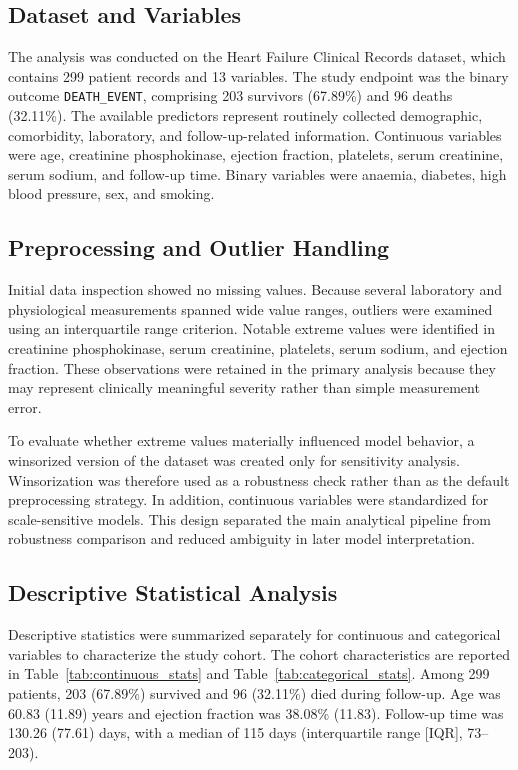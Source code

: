 \subsection{Dataset and Variables}
The analysis was conducted on the Heart Failure Clinical Records dataset, which contains 299 patient records and 13 variables. The study endpoint was the binary outcome \texttt{DEATH\_EVENT}, comprising 203 survivors (67.89\%) and 96 deaths (32.11\%). The available predictors represent routinely collected demographic, comorbidity, laboratory, and follow-up-related information. Continuous variables were age, creatinine phosphokinase, ejection fraction, platelets, serum creatinine, serum sodium, and follow-up time. Binary variables were anaemia, diabetes, high blood pressure, sex, and smoking.


\subsection{Preprocessing and Outlier Handling}
Initial data inspection showed no missing values. Because several laboratory and physiological measurements spanned wide value ranges, outliers were examined using an interquartile range criterion. Notable extreme values were identified in creatinine phosphokinase, serum creatinine, platelets, serum sodium, and ejection fraction. These observations were retained in the primary analysis because they may represent clinically meaningful severity rather than simple measurement error.

To evaluate whether extreme values materially influenced model behavior, a winsorized version of the dataset was created only for sensitivity analysis. Winsorization was therefore used as a robustness check rather than as the default preprocessing strategy. In addition, continuous variables were standardized for scale-sensitive models. This design separated the main analytical pipeline from robustness comparison and reduced ambiguity in later model interpretation.

\subsection{Descriptive Statistical Analysis}
Descriptive statistics were summarized separately for continuous and categorical variables to characterize the study cohort. The cohort characteristics are reported in Table~\ref{tab:continuous_stats} and Table~\ref{tab:categorical_stats}. Among 299 patients, 203 (67.89\%) survived and 96 (32.11\%) died during follow-up. Age was 60.83 (11.89) years and ejection fraction was 38.08\% (11.83). Follow-up time was 130.26 (77.61) days, with a median of 115 days (interquartile range [IQR], 73--203).

